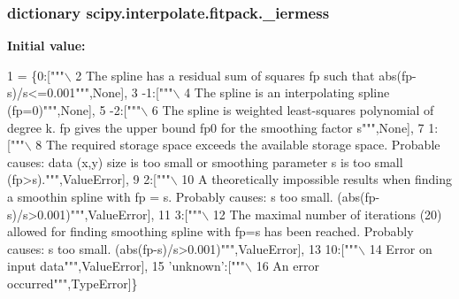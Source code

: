 \subsubsection[{\+\_\+iermess}]{\setlength{\rightskip}{0pt plus 5cm}dictionary scipy.\+interpolate.\+fitpack.\+\_\+iermess}\label{namespacescipy_1_1interpolate_1_1fitpack_ab6715f34ca1201bfec232435cb6095d6}
{\bfseries Initial value\+:}
\begin{DoxyCode}
1 = \{0:[\textcolor{stringliteral}{"""\(\backslash\)}
2 \textcolor{stringliteral}{    The spline has a residual sum of squares fp such that abs(fp-s)/s<=0.001"""},\textcolor{keywordtype}{None}],
3                -1:[\textcolor{stringliteral}{"""\(\backslash\)}
4 \textcolor{stringliteral}{    The spline is an interpolating spline (fp=0)"""},\textcolor{keywordtype}{None}],
5                -2:[\textcolor{stringliteral}{"""\(\backslash\)}
6 \textcolor{stringliteral}{    The spline is weighted least-squares polynomial of degree k.    fp gives the upper bound fp0 for the
       smoothing factor s"""},\textcolor{keywordtype}{None}],
7                1:[\textcolor{stringliteral}{"""\(\backslash\)}
8 \textcolor{stringliteral}{    The required storage space exceeds the available storage space.    Probable causes: data (x,y) size is
       too small or smoothing parameter s is too small (fp>s)."""},ValueError],
9                2:[\textcolor{stringliteral}{"""\(\backslash\)}
10 \textcolor{stringliteral}{    A theoretically impossible results when finding a smoothin spline    with fp = s. Probably causes: s
       too small. (abs(fp-s)/s>0.001)"""},ValueError],
11                3:[\textcolor{stringliteral}{"""\(\backslash\)}
12 \textcolor{stringliteral}{    The maximal number of iterations (20) allowed for finding smoothing    spline with fp=s has been
       reached. Probably causes: s too small.    (abs(fp-s)/s>0.001)"""},ValueError],
13                10:[\textcolor{stringliteral}{"""\(\backslash\)}
14 \textcolor{stringliteral}{    Error on input data"""},ValueError],
15                \textcolor{stringliteral}{'unknown'}:[\textcolor{stringliteral}{"""\(\backslash\)}
16 \textcolor{stringliteral}{    An error occurred"""},TypeError]\}
\end{DoxyCode}
\hypertarget{namespacescipy_1_1interpolate_1_1fitpack_a234ed1709b55f5bbbb71855eb4f4f140}{}
